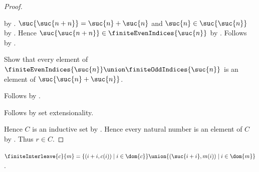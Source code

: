 \begin{proof}
\begin{subproof}
\begin{subproof}
\begin{subproof}
                    by .
                $\suc{\suc{n+n}}=\suc{n}+\suc{n}$ and
                    $\suc{n}\in\suc{\suc{n}}$ by .
                Hence $\suc{\suc{n+n}}
                    \in\finiteEvenIndices{\suc{n}}$
                    by .
                Follows by .
            \end{subproof}
            Show that every element of
                $\finiteEvenIndices{\suc{n}}
                    \union\finiteOddIndices{\suc{n}}$ is an element of
                $\suc{\suc{n}+\suc{n}}$.
            \begin{subproof}
                Follows by
                    .
            \end{subproof}
            Follows by set extensionality.
        \end{subproof}
    \end{subproof}
    Hence $C$ is an inductive set by .
    Hence every natural number is an element of $C$
        by .
    Thus $r\in C$.
\end{proof}

\begin{definition}\label{finite_interleave}
    $\finiteInterleave{c}{m}=
        \{(i+i,c(i))\mid i\in\dom{c}\}\union
        \{(\suc{i+i},m(i))\mid i\in\dom{m}\}$.
\end{definition}

